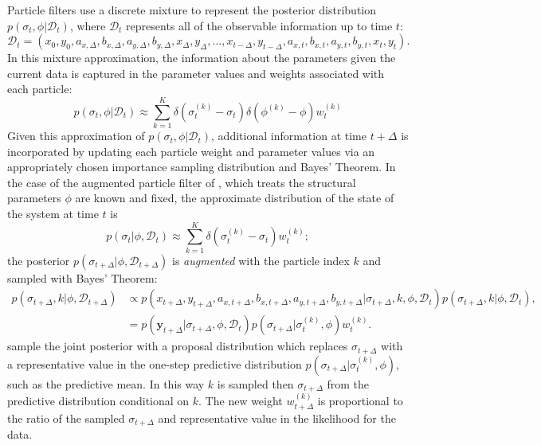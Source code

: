 \documentclass[10pt]{article}
\begin{document}
Particle filters use a discrete mixture to represent the posterior
distribution $p(\sigma_t, \phi | \mathcal{D}_t)$, where
$\mathcal{D}_t$ represents all of the observable information up to
time $t$:
\[
  \mathcal{D}_t = (x_0, y_0, a_{x,\Delta}, b_{x,\Delta}, a_{y,\Delta},
  b_{y,\Delta}, x_\Delta, y_\Delta, \ldots, x_{t-\Delta},
  y_{t-\Delta}, a_{x,t}, b_{x,t}, a_{y,t}, b_{y,t}, x_t, y_t).
\]
In this mixture approximation, the information about the parameters
given the current data is captured in the parameter values and weights
associated with each particle:
\[
  p(\sigma_t, \phi | \mathcal{D}_t) \approx \sum_{k=1}^K \delta(\sigma_t^{(k)} - \sigma_t) \delta(\phi^{(k)} - \phi) w_t^{(k)}
\]
Given this approximation of $p(\sigma_t, \phi | \mathcal{D}_t)$,
additional information at time $t+\Delta$ is incorporated by updating
each particle weight and parameter values via an appropriately chosen
importance sampling distribution and Bayes' Theorem. In the case of
the augmented particle filter of \cite{pitt1999filtering}, which
treats the structural parameters $\phi$ are known and fixed, the
approximate distribution of the state of the system at time $t$ is
\[
  p(\sigma_t | \phi, \mathcal{D}_t) \approx \sum_{k=1}^K
  \delta(\sigma_t^{(k)} - \sigma_t) w_t^{(k)};
\]
the posterior $p(\sigma_{t+\Delta} | \phi, \mathcal{D}_{t+\Delta})$ is
\textit{augmented} with the particle index $k$ and sampled with Bayes' Theorem:
\begin{align}
  p(\sigma_{t+\Delta}, k | \phi, \mathcal{D}_{t+\Delta}) &\propto
                                                           p(x_{t+\Delta}, y_{t+\Delta}, a_{x,t+\Delta}, b_{x, t+\Delta},
                                                           a_{y,t+\Delta}, b_{y, t+\Delta} | \sigma_{t+\Delta}, k, \phi,
                                                           \mathcal{D}_t)p(\sigma_{t+\Delta},k | \phi, \mathcal{D}_t), \\
                                                         &= p(\mathbf{y}_{t+\Delta} | \sigma_{t+\Delta}, \phi, \mathcal{D}_t) p(\sigma_{t+\Delta} | \sigma_{t}^{(k)}, \phi) w^{(k)}_t. \label{eq:augmented-posterior}
\end{align}
\cite{pitt1999filtering} sample the joint posterior with a proposal
distribution which replaces $\sigma_{t+\Delta}$ with a representative
value in the one-step predictive distribution
$p(\sigma_{t+\Delta} | \sigma_t^{(k)}, \phi)$, such as the predictive
mean. In this way $k$ is sampled then $\sigma_{t+\Delta}$ from the
predictive distribution conditional on $k$. The new weight
$w_{t+\Delta}^{(k)}$ is proportional to the ratio of the sampled
$\sigma_{t+\Delta}$ and representative value in the likelihood for the
data.
\end{document}
